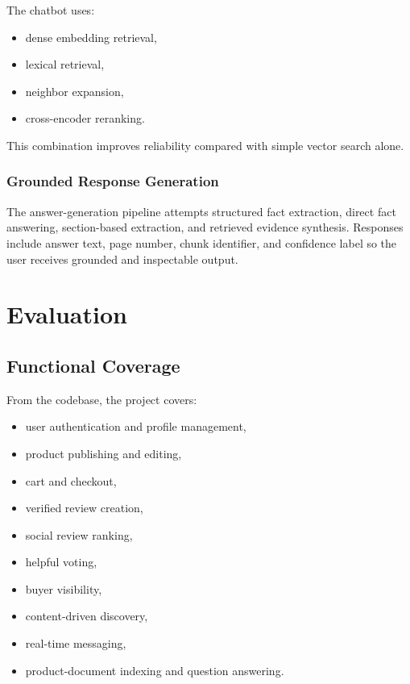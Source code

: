 \documentclass[12pt,letterpaper]{report}
\begin{document}
The chatbot uses:

\begin{itemize}
  \item dense embedding retrieval,
  \item lexical retrieval,
  \item neighbor expansion,
  \item cross-encoder reranking.
\end{itemize}


This combination improves reliability compared with simple vector search alone.

\subsection{Grounded Response Generation}

The answer-generation pipeline attempts structured fact extraction, direct fact answering, section-based extraction, and retrieved evidence synthesis. Responses include answer text, page number, chunk identifier, and confidence label so the user receives grounded and inspectable output.


\chapter{Evaluation}

\section{Functional Coverage}

From the codebase, the project covers:

\begin{itemize}
  \item user authentication and profile management,
  \item product publishing and editing,
  \item cart and checkout,
  \item verified review creation,
  \item social review ranking,
  \item helpful voting,
  \item buyer visibility,
  \item content-driven discovery,
  \item real-time messaging,
  \item product-document indexing and question answering.
\end{itemize}
\end{document}
